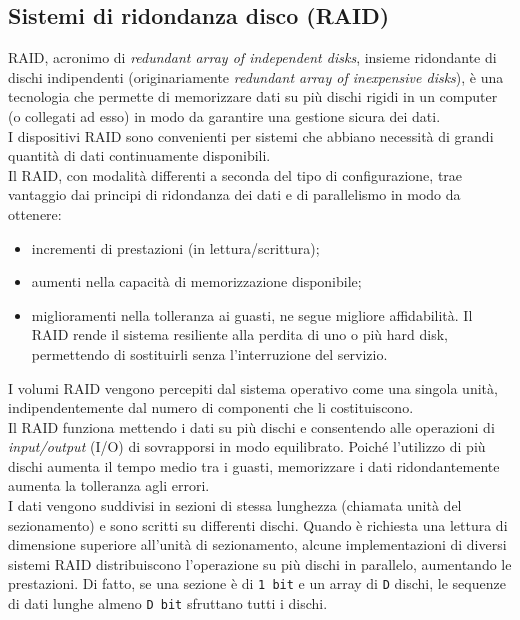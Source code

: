 \subsection{Sistemi di ridondanza disco (RAID)}
RAID, acronimo di \textit{redundant array of independent disks}, insieme ridondante di dischi indipendenti (originariamente \textit{redundant array of inexpensive disks}), \`{e} una tecnologia che permette di memorizzare dati su pi\`{u} dischi rigidi in un computer (o collegati ad esso) in modo da garantire una gestione sicura dei dati\cite{etichetta9}.\\
I dispositivi RAID sono convenienti per sistemi che abbiano necessit\`{a} di grandi quantit\`{a} di dati continuamente disponibili. \\
Il RAID, con modalit\`{a} differenti a seconda del tipo di configurazione, trae vantaggio dai principi di ridondanza dei dati e di parallelismo in modo da ottenere:
\begin{itemize}
\item 
incrementi di prestazioni (in lettura/scrittura);
\item
aumenti nella capacit\`{a} di memorizzazione disponibile;
\item 
miglioramenti nella tolleranza ai guasti, ne segue migliore affidabilit\`{a}\cite{etichetta10}. Il RAID rende il sistema resiliente alla perdita di uno o pi\`{u} hard disk, permettendo di sostituirli senza l'interruzione del servizio.\\
\end{itemize}
I volumi RAID vengono percepiti dal sistema operativo come una singola unit\`{a}, indipendentemente dal numero di componenti che li costituiscono.\\
Il RAID funziona mettendo i dati su pi\`{u} dischi e consentendo alle operazioni di \textit{input/output} (I/O) di sovrapporsi in modo equilibrato. Poich\'{e} l'utilizzo di pi\`{u} dischi aumenta il tempo medio tra i guasti, memorizzare i dati ridondantemente aumenta la tolleranza agli errori\cite{etichetta9}.\\

I dati vengono suddivisi in sezioni di stessa lunghezza (chiamata unit\`{a} del sezionamento) e sono scritti su differenti dischi. Quando \`{e} richiesta una lettura di dimensione superiore all'unit\`{a} di sezionamento, alcune implementazioni di diversi sistemi RAID distribuiscono l'operazione su pi\`{u} dischi in parallelo, aumentando le prestazioni. Di fatto, se una sezione \`{e} di \verb"1 bit" e un array di \verb"D" dischi, le sequenze di dati lunghe almeno \verb"D bit" sfruttano tutti i dischi. 

